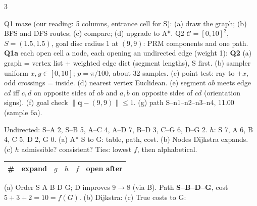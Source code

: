 \begin{multicols}{3}
\begin{examq}
Q1 maze (our reading: 5 columns, entrance cell for S): (a) draw the graph; (b) BFS and DFS routes; (c) compare; (d) upgrade to A*. Q2 $\mathcal C=[0,10]^2$, $S=(1.5,1.5)$, goal disc radius 1 at $(9,9)$: PRM components and one path.
\solution
\textbf{Q1a} each open cell a node, each opening an undirected edge (weight 1): %
\textbf{Q2} (a) graph = vertex list + weighted edge dict (segment lengths), S first. (b) sampler uniform $x,y\in[0,10]$; $p=\pi/100$, about 32 samples. (c) point test: ray to $+x$, odd crossings = inside. (d) nearest vertex Euclidean. (e) segment $ab$ meets edge $cd$ iff $c,d$ on opposite sides of $ab$ and $a,b$ on opposite sides of $cd$ (orientation signs). (f) goal check $\lVert\mathbf q-(9,9)\rVert\le1$. (g) path S--n1--n2--n3--n4, 11.00 (sample 6a). \chk
\end{examq}
\begin{examq}
Undirected: S--A 2, S--B 5, A--C 4, A--D 7, B--D 3, C--G 6, D--G 2. $h$: S 7, A 6, B 4, C 5, D 2, G 0. (a) A* S to G: table, path, cost. (b) Nodes Dijkstra expands. (c) $h$ admissible? consistent?
\solution
Ties: lowest $f$, then alphabetical.\par\vspace{1pt}
\scriptsize\setlength{\tabcolsep}{1.5pt}
\begin{tabularx}{\linewidth}{@{}rcccc>{\raggedright\arraybackslash}X@{}}\toprule
\# & expand & $g$ & $h$ & $f$ & open after\\\midrule
\bottomrule\end{tabularx}\par\vspace{1pt}\small
(a) Order S A B D G; D improves $9\to8$ (via B). Path \textbf{S--B--D--G}, cost $5+3+2=\boxed{10}=f(G)$. 
(b) Dijkstra: %
(c) True costs to G: %

\end{examq}
\end{multicols}
